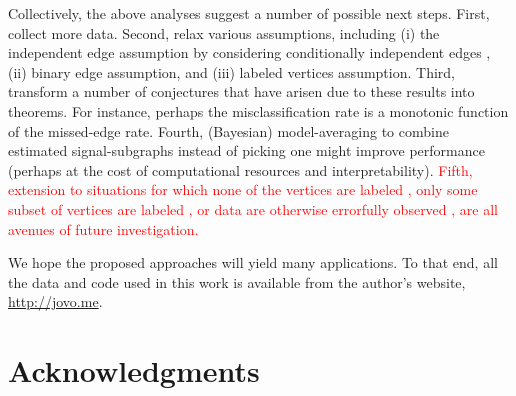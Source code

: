 \documentclass[10pt,journal,cspaper,compsoc]{IEEEtran}
\providecommand{\tr}[1]{\textcolor{red}{#1}}
\begin{document}
Collectively, the above analyses suggest a number of possible next steps.  First, collect more data.  Second, relax various assumptions, including (i) the independent edge assumption by considering conditionally independent edges \cite{Hoff02,STFP,Fishkind2012}, (ii) binary edge assumption, and (iii) labeled vertices assumption.  Third, transform a number of conjectures that have arisen due to these results into theorems.  For instance, perhaps the misclassification rate is a monotonic function of the missed-edge rate.  Fourth, (Bayesian) model-averaging to combine estimated signal-subgraphs instead of picking one might improve performance (perhaps at the cost of computational resources and interpretability).  \tr{Fifth, extension to situations for which none of the vertices are labeled \cite{VP11_QAP, VP11_unlabeled},  only some subset of vertices are labeled \cite{VN,BVN}, or data are otherwise errorfully observed \cite{Bock2011}, are all avenues of future investigation.}

We hope the proposed approaches will yield many applications.  To that end, all the data and code used in this work is available from the author's website, \url{http://jovo.me}.  

% 
% 
% 


% 

\ifCLASSOPTIONcompsoc
  \section*{Acknowledgments}
\else
\end{document}
